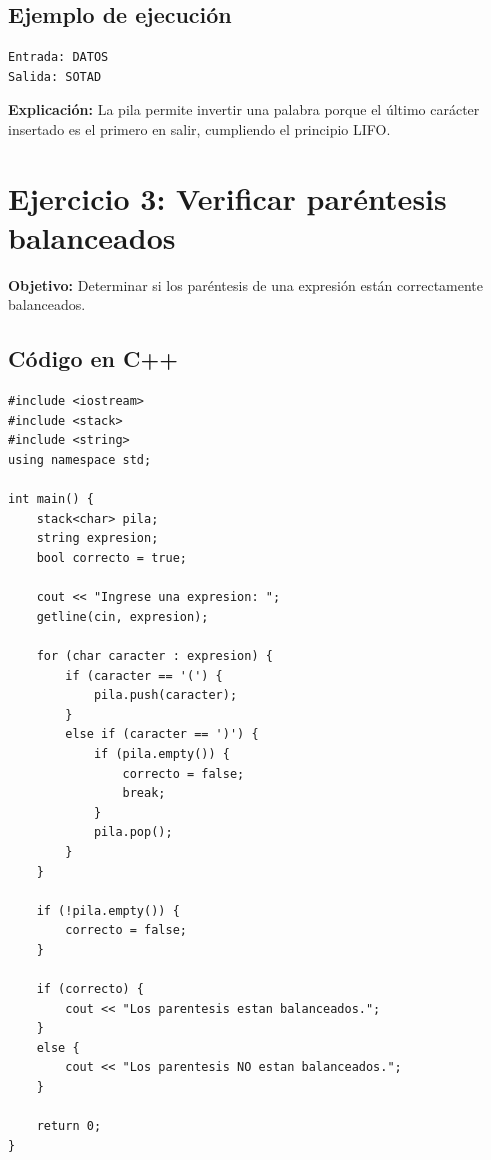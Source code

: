 \documentclass[11pt, a4paper]{article}
\begin{document}
\subsection*{Ejemplo de ejecución}

\begin{verbatim}
Entrada: DATOS
Salida: SOTAD
\end{verbatim}

\textbf{Explicación:} La pila permite invertir una palabra porque el último carácter insertado es el primero en salir, cumpliendo el principio LIFO.

\vspace{0.5cm}

\section{\color{mainnavy}Ejercicio 3: Verificar paréntesis balanceados}

\textbf{Objetivo:} Determinar si los paréntesis de una expresión están correctamente balanceados.

\subsection*{Código en C++}

\begin{lstlisting}[style=cppstyle]
#include <iostream>
#include <stack>
#include <string>
using namespace std;

int main() {
    stack<char> pila;
    string expresion;
    bool correcto = true;

    cout << "Ingrese una expresion: ";
    getline(cin, expresion);

    for (char caracter : expresion) {
        if (caracter == '(') {
            pila.push(caracter);
        }
        else if (caracter == ')') {
            if (pila.empty()) {
                correcto = false;
                break;
            }
            pila.pop();
        }
    }

    if (!pila.empty()) {
        correcto = false;
    }

    if (correcto) {
        cout << "Los parentesis estan balanceados.";
    }
    else {
        cout << "Los parentesis NO estan balanceados.";
    }

    return 0;
}
\end{lstlisting}
\end{document}
